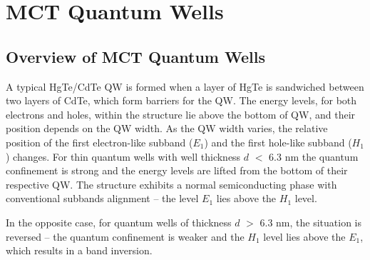 \documentclass[titlepage,a4paper]{book}
\newcommand{\wciecie}{\quad\phantom{v}}
\begin{document}




\chapter{MCT Quantum Wells}
\label{chpt:MCT_QW}

\section{Overview of MCT Quantum Wells}
\wciecie
A typical HgTe/CdTe QW is formed when a layer of HgTe is sandwiched between two layers of CdTe, which form barriers for the QW. The energy levels, for both electrons and holes, within the structure lie above the bottom of QW, and their position depends on the QW width. As the QW width varies, the relative position of the first electron-like subband ($E_1$) and the first hole-like subband ($H_1$) changes. For thin quantum wells with well thickness $d$ $<$ 6.3 nm the quantum confinement is strong and the energy levels are lifted from the bottom of their respective QW. The structure exhibits a normal semiconducting phase with conventional subbands alignment -- the level $E_1$ lies above the $H_1$ level. 

In the opposite case, for quantum wells of thickness $d$ $>$ 6.3 nm, the situation is reversed -- the quantum confinement is weaker and the $H_1$ level lies above the $E_1$, which results in a band inversion. 
\end{document}

